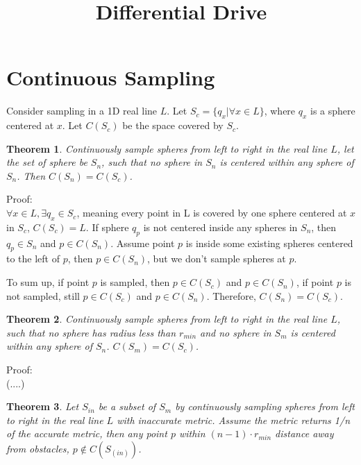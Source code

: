 \documentclass[12pt]{article}
\title{Differential Drive}
\date{}
\newtheorem{theorem}{Theorem}[section]
\begin{document}
  \maketitle
  
  \section{Continuous Sampling}
  Consider sampling in a 1D real line $L$. Let $S_{c} = \{q_{x} | \forall x \in L\}$, where $q_{x}$ is a sphere centered at $x$. Let $C(S_{c})$ be the space covered by $S_{c}$.
  
  \begin{theorem}
  Continuously sample spheres from left to right in the real line $L$, let the set of sphere be $S_{n}$, such that no sphere in $S_{n}$ is centered within any sphere of $S_{n}$. Then $C(S_{n}) = C(S_{c})$.
  \end{theorem}
  
  Proof:\\
  
  $\forall x \in L, \exists q_{x} \in S_{c}$, meaning every point in L is covered by one sphere centered at $x$ in $S_{c}$, $C(S_{c}) = L$. If sphere $q_{p}$ is not centered inside any spheres in $S_{n}$, then $q_{p} \in S_{n}$ and $p \in C(S_{n})$. Assume point $p$ is inside some existing spheres centered to the left of $p$, then $p \in C(S_{n})$, but we don't sample spheres at $p$. 
  
  To sum up, if point $p$ is sampled, then $p \in C(S_{c})$ and $p \in C(S_{n})$, if point $p$ is not sampled, still $p \in C(S_{c})$ and $p \in C(S_{n})$. Therefore, $C(S_{n}) = C(S_{c})$.
  
  \begin{theorem}
  Continuously sample spheres from left to right in the real line $L$, such that no sphere has radius less than $r_{min}$ and no sphere in $S_{m}$ is centered within any sphere of $S_{n}$. $C(S_{m}) = C(S_{c})$.
  \end{theorem}

  Proof:\\
  
  (....)
  
  \begin{theorem}
  Let $S_{in}$ be a subset of $S_{m}$ by continuously sampling spheres from left to right in the real line $L$ with inaccurate metric. Assume the metric returns 1/n of the accurate metric, then any point $p$ within $(n-1) \cdot r_{min}$ distance away from obstacles, $p \notin C(S_(in))$.
  \end{theorem}
  
\end{document}

